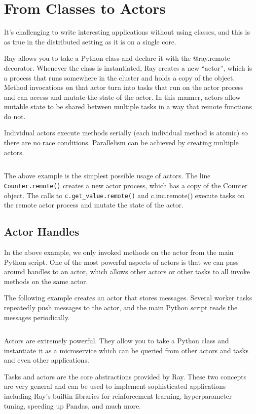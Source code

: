 \section{From Classes to Actors}
It’s challenging to write interesting applications without using classes, and this is as true in the distributed setting as it is on a single core.

Ray allows you to take a Python class and declare it with the @ray.remote decorator. Whenever the class is instantiated, Ray creates a new “actor”, which is a process that runs somewhere in the cluster and holds a copy of the object. Method invocations on that actor turn into tasks that run on the actor process and can access and mutate the state of the actor. In this manner, actors allow mutable state to be shared between multiple tasks in a way that remote functions do not.

Individual actors execute methods serially (each individual method is atomic) so there are no race conditions. Parallelism can be achieved by creating multiple actors.

\inputminted{python}{../src/05.ActorsClasses.py}

The above example is the simplest possible usage of actors. The line \verb|Counter.remote()| creates a new actor process, which has a copy of the Counter object. The calls to \verb|c.get_value.remote()| and c.inc.remote() execute tasks on the remote actor process and mutate the state of the actor.

\subsection{Actor Handles}
In the above example, we only invoked methods on the actor from the main Python script. One of the most powerful aspects of actors is that we can pass around handles to an actor, which allows other actors or other tasks to all invoke methods on the same actor.

The following example creates an actor that stores messages. Several worker tasks repeatedly push messages to the actor, and the main Python script reads the messages periodically.

\inputminted{python}{../src/06.ActorHandles.py}

Actors are extremely powerful. They allow you to take a Python class and instantiate it as a microservice which can be queried from other actors and tasks and even other applications.

Tasks and actors are the core abstractions provided by Ray. These two concepts are very general and can be used to implement sophisticated applications including Ray’s builtin libraries for reinforcement learning, hyperparameter tuning, speeding up Pandas, and much more.